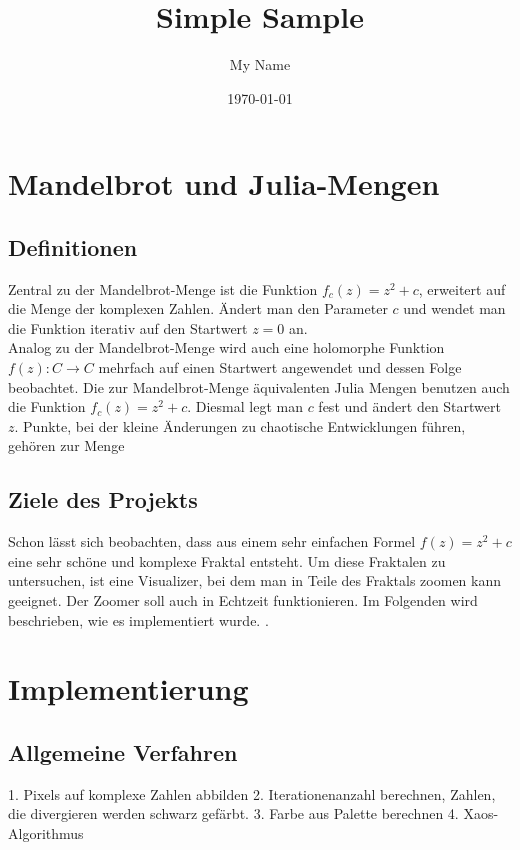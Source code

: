 \documentclass{article}
\title{Simple Sample} %
\author{My Name} %
\date{\today} %
\begin{document}
		\maketitle %
		
\section{Mandelbrot und Julia-Mengen}
\subsection{Definitionen}
Zentral zu der Mandelbrot-Menge ist die Funktion $f_c(z) = z^2 + c$, erweitert auf die Menge der komplexen Zahlen. Ändert man den Parameter $c$ und wendet man die Funktion iterativ auf den Startwert $z=0$ an. \\
Analog zu der Mandelbrot-Menge wird auch eine holomorphe Funktion $f(z): C \rightarrow C$ mehrfach auf einen Startwert angewendet und dessen Folge beobachtet. Die zur Mandelbrot-Menge äquivalenten Julia Mengen benutzen auch die Funktion $f_c(z) = z^2 + c$. Diesmal legt man $c$ fest und ändert den Startwert $z$. Punkte, bei der kleine Änderungen zu chaotische Entwicklungen führen, gehören zur Menge


\subsection{Ziele des Projekts}	
Schon lässt sich beobachten, dass aus einem sehr einfachen Formel $f(z) = z^2 + c$ eine sehr schöne und komplexe Fraktal entsteht. Um diese Fraktalen zu untersuchen, ist eine Visualizer, bei dem man in Teile des Fraktals zoomen kann geeignet. Der Zoomer soll auch in Echtzeit funktionieren. Im Folgenden wird beschrieben, wie es implementiert wurde. \cite{quilez}.

\section{Implementierung}
\subsection{Allgemeine Verfahren}
1. Pixels auf komplexe Zahlen abbilden
2. Iterationenanzahl berechnen, Zahlen, die divergieren werden schwarz gefärbt.
3. Farbe aus Palette berechnen
4. Xaos-Algorithmus
\end{document}
